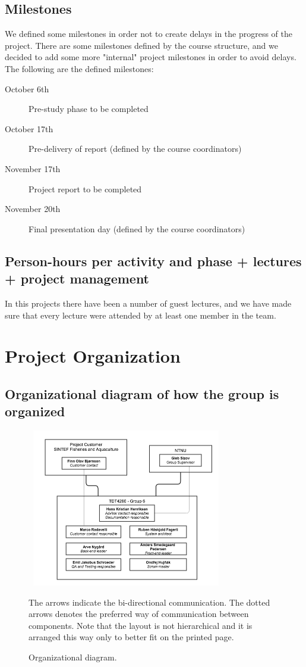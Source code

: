 \documentclass[11pt,a4paper,titlepage,oneside]{report}
\begin{document}
\subsection{Milestones}
We defined some milestones in order not to create delays in the progress of the project.
There are some milestones defined by the course structure, and we decided to add some more "internal" project milestones in order to avoid delays.
The following are the defined milestones:
\begin{description}
\item[October 6th] Pre-study phase to be completed
\item[October 17th] Pre-delivery of report (defined by the course coordinators)
\item[November 17th] Project report to be completed
\item[November 20th] Final presentation day (defined by the course coordinators)
\end{description}

\subsection{Person-hours per activity and phase + lectures + project management}
In this projects there have been a number of guest lectures, and we have made sure that every lecture were attended by at least one member in the team.

\section{Project Organization}
\subsection{Organizational diagram of how the group is organized}

\begin{figure}[h]
\begin{center}
\includegraphics[height=260px,width=328px]{img/tdt4290_group_6_organizational_structure.png}
\caption{Organizational diagram.}
\label{fig:organizational-structure}
\medskip
\small
The arrows indicate the bi-directional communication. The dotted arrows denotes the preferred way of communication between components. Note that the layout is not hierarchical and it is arranged this way only to better fit on the printed page.
\end{center}
\end{figure}
\end{document}
